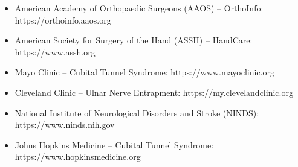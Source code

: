 \begin{itemize}
  \item American Academy of Orthopaedic Surgeons (AAOS) -- OrthoInfo:
  https://orthoinfo.aaos.org
  \item American Society for Surgery of the Hand (ASSH) -- HandCare:
  https://www.assh.org
  \item Mayo Clinic -- Cubital Tunnel Syndrome:
  https://www.mayoclinic.org
  \item Cleveland Clinic -- Ulnar Nerve Entrapment:
  https://my.clevelandclinic.org
  \item National Institute of Neurological Disorders and Stroke (NINDS):
  https://www.ninds.nih.gov
  \item Johns Hopkins Medicine -- Cubital Tunnel Syndrome:
  https://www.hopkinsmedicine.org
\end{itemize}